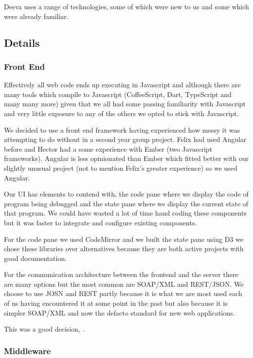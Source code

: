 \documentclass[11pt, a4paper]{article}
\begin{document}
Deeva uses a range of technologies, some of which were new to us and some which were already familiar.

\subsection{Details}
\subsubsection{Front End}
Effectively all web code ends up executing in Javascript and although there are many tools which compile to Javascript (CoffeeScript, Dart, TypeScript and many many more) given that we all had some passing familiarity with Javascript and very little exposure to any of the others we opted to stick with Javascript.

We decided to use a front end framework having experienced how messy it was attempting to do without in a second year group project.
Felix had used Angular before and Hector had a some experience with Ember (two Javascript frameworks).
Angular is less opinionated than Ember which fitted better with our slightly unusual project (not to mention Felix's greater experience) so we used Angular.

Our UI has elements to contend with, the code pane where we display the code of program being debugged and the state pane where we display the current state of that program.
We could have wasted a lot of time hand coding these components but it was faster to integrate and configure existing components.

For the code pane we used CodeMirror and we built the state pane using D3 we chose these libraries over alternatives because they are both active projects with good documentation. 

For the communication architecture between the frontend and the server there are many options but the most common are SOAP/XML and REST/JSON.
We choose to use JOSN and REST partly because it is what we are most used each of us having encountered it at some point in the past but also because it is simpler SOAP/XML and now the defacto standard for new web applications.

This was a good decision, .

\subsubsection{Middleware}
\end{document}
